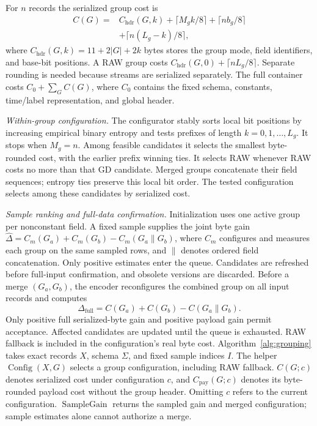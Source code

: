 \documentclass[10pt,journal]{IEEEtran}
\begin{document}
For $n$ records the serialized group cost is
\begin{equation}\label{eq:cost}
\begin{split}
C(G)={}&C_{\mathrm{hdr}}(G,k)+\lceil M_gk/8\rceil+\lceil nb_g/8\rceil\\
 &+\lceil n(L_g-k)/8\rceil,
\end{split}
\end{equation}
where $C_{\mathrm{hdr}}(G,k)=11+2|G|+2k$ bytes stores the group mode,
field identifiers, and base-bit positions. A RAW group costs
$C_{\mathrm{hdr}}(G,0)+\lceil nL_g/8\rceil$. Separate
rounding is needed because streams are serialized separately. The full
container costs $C_0+\sum_G C(G)$, where $C_0$ contains the fixed schema,
constants, time/label representation, and global header.

\emph{Within-group configuration.}
The configurator stably sorts local bit positions by increasing empirical
binary entropy and tests prefixes of length $k=0,1,\ldots,L_g$.
It stops when $M_g=n$. Among feasible candidates it selects
the smallest byte-rounded cost, with the earlier prefix winning ties.
It selects RAW whenever RAW costs no more than that GD candidate.
Merged groups concatenate their field sequences; entropy ties preserve
this local bit order. The tested configuration selects among these candidates by serialized cost.

\emph{Sample ranking and full-data confirmation.}
Initialization uses one active group per nonconstant field. A fixed
sample supplies the joint byte gain
$\widehat\Delta=C_m(G_a)+C_m(G_b)-C_m(G_a\mathbin{\|}G_b)$,
where $C_m$ configures and measures each group on the same sampled rows,
and $\|$ denotes ordered field concatenation. Only positive estimates enter the queue.
Candidates are refreshed before full-input confirmation, and obsolete
versions are discarded.
Before a merge $(G_a,G_b)$, the encoder reconfigures the combined group
on all input records and computes
\begin{equation}
\Delta_{\mathrm{full}}=C(G_a)+C(G_b)-C(G_a\mathbin{\|}G_b).
\end{equation}
Only positive full serialized-byte gain and positive payload gain permit
acceptance. Affected candidates are updated until the queue is exhausted.
RAW fallback is included in the configuration's real byte cost.
Algorithm~\ref{alg:grouping} takes exact records $X$, schema $\Sigma$,
and fixed sample indices $I$. The helper $\operatorname{Config}(X,G)$
selects a group configuration, including RAW fallback.
$C(G;c)$ denotes serialized cost under configuration $c$, and
$C_{\mathrm{pay}}(G;c)$ denotes its byte-rounded payload cost without the
group header. Omitting $c$ refers to the current configuration.
$\operatorname{SampleGain}$ returns the sampled gain and merged
configuration; sample estimates alone cannot authorize a merge.
\end{document}
